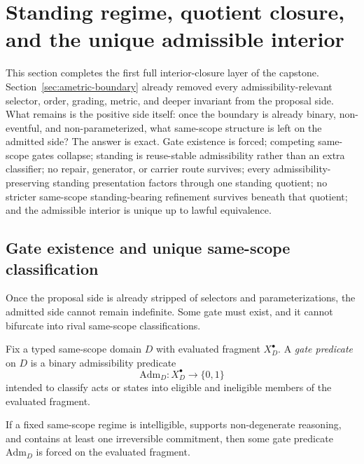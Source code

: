\section{Standing regime, quotient closure, and the unique admissible interior}
\label{sec:standing-regime}

This section completes the first full interior-closure layer of the capstone. Section~\ref{sec:ametric-boundary} already removed every admissibility-relevant selector, order, grading, metric, and deeper invariant from the proposal side. What remains is the positive side itself: once the boundary is already binary, non-eventful, and non-parameterized, what same-scope structure is left on the admitted side? The answer is exact. Gate existence is forced; competing same-scope gates collapse; standing is reuse-stable admissibility rather than an extra classifier; no repair, generator, or carrier route survives; every admissibility-preserving standing presentation factors through one standing quotient; no stricter same-scope standing-bearing refinement survives beneath that quotient; and the admissible interior is unique up to lawful equivalence.\cite{MaleyNecessity,MaleyStandingEquivalence,MaleyExhaustion,MaleyTrajectory,MaleyUnus,MaleyATS}

\subsection{Gate existence and unique same-scope classification}

Once the proposal side is already stripped of selectors and parameterizations, the admitted side cannot remain indefinite. Some gate must exist, and it cannot bifurcate into rival same-scope classifications.

\begin{definition}
Fix a typed same-scope domain $D$ with evaluated fragment $X_D^{\bullet}$. A \emph{gate predicate} on $D$ is a binary admissibility predicate
\[
\mathrm{Adm}_D : X_D^{\bullet} \to \{0,1\}
\]
intended to classify acts or states into eligible and ineligible members of the evaluated fragment.
\end{definition}

\begin{theorem}
\label{thm:gate-existence-fixed-scope}
If a fixed same-scope regime is intelligible, supports non-degenerate reasoning, and contains at least one irreversible commitment, then some gate predicate $\mathrm{Adm}_D$ is forced on the evaluated fragment.
\end{theorem}

